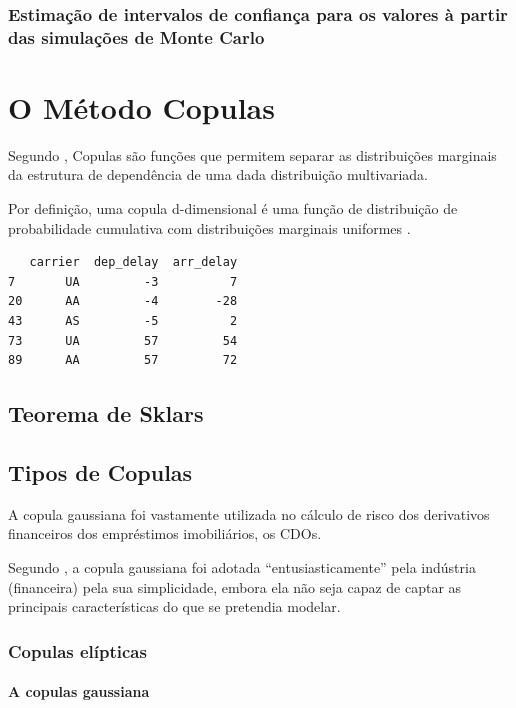 \documentclass[
	12pt,				%
	oneside,			%
	a4paper,			%
	chapter=TITLE,		%
	section=TITLE,		%
	english,			%
	brazil				%
	]{abntex2}
\begin{document}
\subsection{Estimação de intervalos de confiança para os valores à
partir das simulações de Monte
Carlo}\label{estimauxe7uxe3o-de-intervalos-de-confianuxe7a-para-os-valores-uxe0-partir-das-simulauxe7uxf5es-de-monte-carlo}

\hypertarget{copulas}{\chapter{O Método Copulas}\label{copulas}}

Segundo \textcite{copulas}, Copulas são funções que permitem separar as
distribuições marginais da estrutura de dependência de uma dada
distribuição multivariada.

Por definição, uma copula d-dimensional é uma função de distribuição de
probabilidade cumulativa com distribuições marginais uniformes
\autocite[1]{copulas}.
\begin{verbatim}
   carrier  dep_delay  arr_delay
7       UA         -3          7
20      AA         -4        -28
43      AS         -5          2
73      UA         57         54
89      AA         57         72
\end{verbatim}
\section{Teorema de Sklars}\label{teorema-de-sklars}

\section{Tipos de Copulas}\label{tipos-de-copulas}

A copula gaussiana foi vastamente utilizada no cálculo de risco dos
derivativos financeiros dos empréstimos imobiliários, os \gls{CDO}s.

Segundo \textcite{devil}, a copula gaussiana foi adotada
``entusiasticamente'' pela indústria (financeira) pela sua simplicidade,
embora ela não seja capaz de captar as principais características do que
se pretendia modelar.

\subsection{Copulas elípticas}\label{copulas-eluxedpticas}

\subsubsection{A copulas gaussiana}\label{a-copulas-gaussiana}
\end{document}
